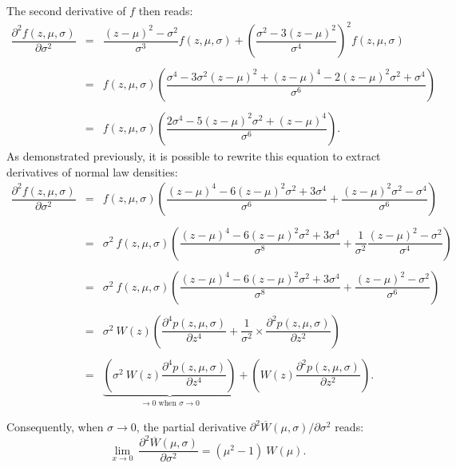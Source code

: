 The second derivative of $f$ then reads:
\begin{equation}
\begin{array}{rcl}
\dfrac{\partial^2 f(z,\mu,\sigma)}{\partial \sigma^2} & = & \dfrac{(z-\mu)^2-\sigma^2}{\sigma^3} f(z,\mu,\sigma) + \left( \dfrac{\sigma^2-3(z-\mu)^2}{\sigma^4}\right)^2 f(z,\mu,\sigma)\\\\
& = & f(z,\mu,\sigma) \left( \dfrac{\sigma^4-3\sigma^2(z-\mu)^2+(z-\mu)^4-2(z-\mu)^2\sigma^2+\sigma^4}{\sigma^6} \right)\\\\
& = & f(z,\mu,\sigma) \left( \dfrac{2\sigma^4-5(z-\mu)^2\sigma^2+(z-\mu)^4}{\sigma^6} \right).
\end{array}
\end{equation}
As demonstrated previously, it is possible to rewrite this equation to extract derivatives of normal law densities:
\begin{equation}
\begin{array}{rcl}
\dfrac{\partial^2 f(z,\mu,\sigma)}{\partial \sigma^2} & = & f(z,\mu,\sigma) \left( \dfrac{(z-\mu)^4-6(z-\mu)^2\sigma^2+3\sigma^4}{\sigma^6}+\dfrac{(z-\mu)^2\sigma^2-\sigma^4}{\sigma^6} \right)\\\\
& = & \sigma^2\ f(z,\mu,\sigma) \left( \dfrac{(z-\mu)^4-6(z-\mu)^2\sigma^2+3\sigma^4}{\sigma^8} + \dfrac{1}{\sigma^2}\dfrac{(z-\mu)^2-\sigma^2}{\sigma^4} \right)\\\\
& = & \sigma^2\ f(z,\mu,\sigma) \left( \dfrac{(z-\mu)^4-6(z-\mu)^2\sigma^2+3\sigma^4}{\sigma^8} + \dfrac{(z-\mu)^2-\sigma^2}{\sigma^6} \right)\\\\
& = & \sigma^2\ W(z) \left( \dfrac{\partial^4 p(z,\mu,\sigma)}{\partial z^4} + \dfrac{1}{\sigma^2} \times \dfrac{\partial^2 p(z,\mu,\sigma)}{\partial z^2} \right)\\\\
& = & \underbrace{\left( \sigma^2\ W(z) \dfrac{\partial^4 p(z,\mu,\sigma)}{\partial z^4} \right)}_{\rightarrow 0 \text{ when } \sigma \rightarrow 0} + \left(W(z) \dfrac{\partial^2 p(z,\mu,\sigma)}{\partial z^2} \right).
\end{array}
\label{eq:part1:second_derivative}
\end{equation}

Consequently, when $\sigma \rightarrow 0$, the partial derivative $\partial^2 \overline{W}(\mu,\sigma)/\partial \sigma^2$ reads:
\begin{equation}
\lim\limits_{x \to 0}\ \dfrac{\partial^2 \overline{W}(\mu,\sigma)}{\partial \sigma^2} = (\mu^2-1)\ W(\mu).
\label{eq:part1:d2wdsigma}
\end{equation}


